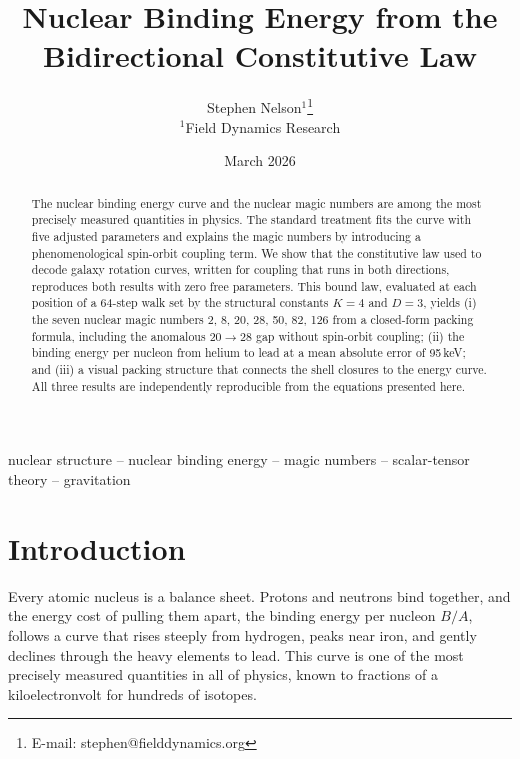 \documentclass[fleqn,usenatbib]{mnras}
\title{Nuclear Binding Energy from the Bidirectional Constitutive Law}
\author[S. Nelson]{Stephen Nelson$^{1}$\thanks{E-mail: stephen@fielddynamics.org}\\
$^{1}$Field Dynamics Research}
\date{March 2026}
\begin{document}
\maketitle

\begin{abstract}
The nuclear binding energy curve and the nuclear magic numbers are among the most precisely measured quantities in physics. The standard treatment fits the curve with five adjusted parameters and explains the magic numbers by introducing a phenomenological spin-orbit coupling term. We show that the constitutive law used to decode galaxy rotation curves, written for coupling that runs in both directions, reproduces both results with zero free parameters. This bound law, evaluated at each position of a 64-step walk set by the structural constants $K\!=\!4$ and $D\!=\!3$, yields (i) the seven nuclear magic numbers 2, 8, 20, 28, 50, 82, 126 from a closed-form packing formula, including the anomalous $20\!\to\!28$ gap without spin-orbit coupling; (ii) the binding energy per nucleon from helium to lead at a mean absolute error of 95\,keV; and (iii) a visual packing structure that connects the shell closures to the energy curve. All three results are independently reproducible from the equations presented here.
\end{abstract}

\begin{keywords}
nuclear structure -- nuclear binding energy -- magic numbers -- scalar-tensor theory -- gravitation
\end{keywords}

\section{Introduction}
\label{sec:intro}

Every atomic nucleus is a balance sheet. Protons and neutrons bind together, and the energy cost of pulling them apart, the binding energy per nucleon $B/A$, follows a curve that rises steeply from hydrogen, peaks near iron, and gently declines through the heavy elements to lead. This curve is one of the most precisely measured quantities in all of physics, known to fractions of a kiloelectronvolt for hundreds of isotopes.
\end{document}
